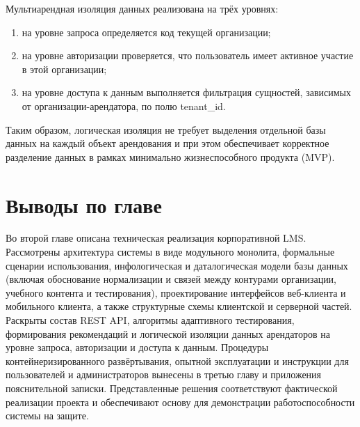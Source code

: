 Мультиарендная изоляция данных реализована на трёх уровнях\cite{yojji_multitenant_lms_2025,owasp_top10_2021}:
\begin{enumerate}
  \item на уровне запроса определяется код текущей организации;
  \item на уровне авторизации проверяется, что пользователь имеет активное участие в этой организации;
  \item на уровне доступа к данным выполняется фильтрация сущностей, зависимых от организации-арендатора, по полю tenant\_id.
\end{enumerate}

Таким образом, логическая изоляция не требует выделения отдельной базы данных на каждый объект арендования и при этом обеспечивает корректное разделение данных в рамках минимально жизнеспособного продукта (MVP).

\section{Выводы по главе}

Во второй главе описана техническая реализация корпоративной LMS. Рассмотрены архитектура системы в виде модульного монолита, формальные сценарии использования, инфологическая и даталогическая модели базы данных (включая обоснование нормализации и связей между контурами организации, учебного контента и тестирования), проектирование интерфейсов веб-клиента и мобильного клиента, а также структурные схемы клиентской и серверной частей. Раскрыты состав REST API, алгоритмы адаптивного тестирования, формирования рекомендаций и логической изоляции данных арендаторов на уровне запроса, авторизации и доступа к данным. Процедуры контейнеризированного развёртывания, опытной эксплуатации и инструкции для пользователей и администраторов вынесены в третью главу и приложения пояснительной записки. Представленные решения соответствуют фактической реализации проекта и обеспечивают основу для демонстрации работоспособности системы на защите\cite{grekul_proj_is,fowler_patterns_ru,booch2006uml}.
